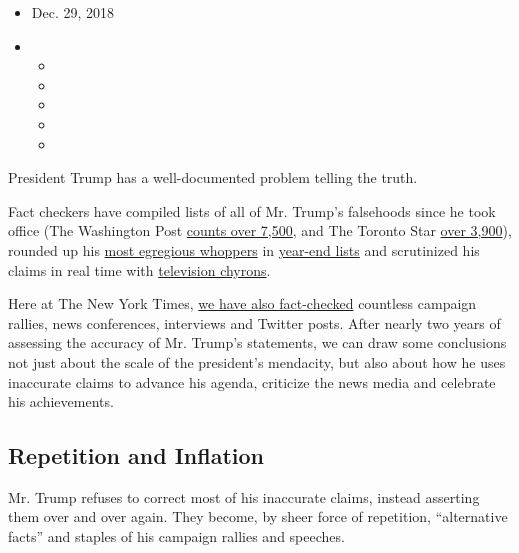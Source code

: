 \begin{itemize}
\item
  Dec. 29, 2018
\item
  \begin{itemize}
  \item
  \item
  \item
  \item
  \item
  \end{itemize}
\end{itemize}

President Trump has a well-documented problem telling the truth.

Fact checkers have compiled lists of all of Mr. Trump's falsehoods since
he took office (The Washington Post
\href{https://www.washingtonpost.com/graphics/politics/trump-claims-database/?utm_term=.f0fb3ee77790}{counts
over 7,500}, and The Toronto Star
\href{http://projects.thestar.com/donald-trump-fact-check/}{over
3,900}), rounded up his
\href{https://www.politifact.com/truth-o-meter/article/2018/dec/11/trump-file-10-top-falsehoods-2018/}{most
egregious whoppers} in
\href{https://www.factcheck.org/2018/12/the-whoppers-of-2018/}{year-end
lists} and scrutinized his claims in real time with
\href{https://www.washingtonpost.com/graphics/2018/lifestyle/style/how-cable-news-chyrons-have-adapted-to-the-trump-era/?utm_term=.5d2df35f9e33}{television
chyrons}.

Here at The New York Times,
\href{https://www.nytimes3xbfgragh.onion/spotlight/fact-checks}{we have
also fact-checked} countless campaign rallies, news conferences,
interviews and Twitter posts. After nearly two years of assessing the
accuracy of Mr. Trump's statements, we can draw some conclusions not
just about the scale of the president's mendacity, but also about how he
uses inaccurate claims to advance his agenda, criticize the news media
and celebrate his achievements.

\hypertarget{repetition-and-inflation}{%
\subsection{Repetition and Inflation}\label{repetition-and-inflation}}

Mr. Trump refuses to correct most of his inaccurate claims, instead
asserting them over and over again. They become, by sheer force of
repetition, ``alternative facts'' and staples of his campaign rallies
and speeches.

